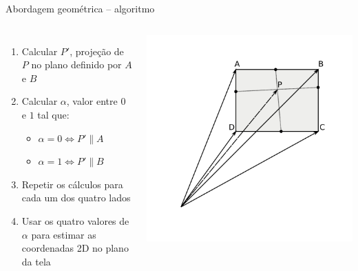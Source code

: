 \documentclass{beamer}
\begin{document}
\begin{frame}{Abordagem geométrica -- algoritmo}
	\begin{columns}
		\begin{enumerate}[<+->]
		\item Calcular $P'$, projeção de $P$ no plano definido por $A$ e $B$
		\item Calcular $\alpha$, valor entre $0$ e $1$ tal que:
			\begin{itemize}
			\item $\alpha = 0 \iff P' \parallel A $
			\item $\alpha = 1 \iff P' \parallel B $
			\end{itemize}
		\item Repetir os cálculos para cada um dos quatro lados
		\item Usar os quatro valores de $\alpha$ para estimar as coordenadas 2D no plano da tela
		\end{enumerate}

		\includegraphics[keepaspectratio, width=1.0\textwidth, height=0.8\textheight, clip, trim=0.75in 0.75in 0.70in 0.50in]{../monografia/img/geometria_ABCD2.pdf}
	\end{columns}
\end{frame}
\end{document}
